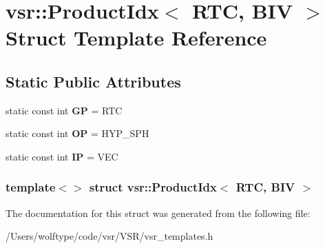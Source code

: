 \hypertarget{structvsr_1_1_product_idx_3_01_r_t_c_00_01_b_i_v_01_4}{\section{vsr\-:\-:Product\-Idx$<$ R\-T\-C, B\-I\-V $>$ Struct Template Reference}
\label{structvsr_1_1_product_idx_3_01_r_t_c_00_01_b_i_v_01_4}
}
\subsection*{Static Public Attributes}
\begin{DoxyCompactItemize}
\item 
\hypertarget{structvsr_1_1_product_idx_3_01_r_t_c_00_01_b_i_v_01_4_adbbb2b582422137d92870f9060efe240}{static const int {\bfseries G\-P} = R\-T\-C}\label{structvsr_1_1_product_idx_3_01_r_t_c_00_01_b_i_v_01_4_adbbb2b582422137d92870f9060efe240}

\item 
\hypertarget{structvsr_1_1_product_idx_3_01_r_t_c_00_01_b_i_v_01_4_a2a0e5b2b6f8fc8e6f5197a5b6491ef40}{static const int {\bfseries O\-P} = H\-Y\-P\-\_\-\-S\-P\-H}\label{structvsr_1_1_product_idx_3_01_r_t_c_00_01_b_i_v_01_4_a2a0e5b2b6f8fc8e6f5197a5b6491ef40}

\item 
\hypertarget{structvsr_1_1_product_idx_3_01_r_t_c_00_01_b_i_v_01_4_a90647a4b6ebb8293b340632041565d0f}{static const int {\bfseries I\-P} = V\-E\-C}\label{structvsr_1_1_product_idx_3_01_r_t_c_00_01_b_i_v_01_4_a90647a4b6ebb8293b340632041565d0f}

\end{DoxyCompactItemize}
\subsubsection*{template$<$$>$ struct vsr\-::\-Product\-Idx$<$ R\-T\-C, B\-I\-V $>$}



The documentation for this struct was generated from the following file\-:\begin{DoxyCompactItemize}
\item 
/\-Users/wolftype/code/vsr/\-V\-S\-R/vsr\-\_\-templates.\-h\end{DoxyCompactItemize}
